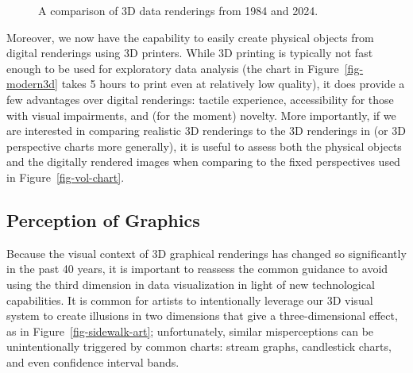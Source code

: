 \documentclass[runningheads
]{llncs}
\begin{document}
\begin{figure}
\begin{minipage}[t]{0.48\linewidth}
{{}

}

\end{minipage}%

\caption{\label{fig-graphical-advances}A comparison of 3D data
renderings from 1984 and 2024.}

\end{figure}

Moreover, we now have the capability to easily create physical objects
from digital renderings using 3D printers. While 3D printing is
typically not fast enough to be used for exploratory data analysis (the
chart in Figure~\ref{fig-modern3d} takes 5 hours to print even at
relatively low quality), it does provide a few advantages over digital
renderings: tactile experience, accessibility for those with visual
impairments, and (for the moment) novelty. More importantly, if we are
interested in comparing realistic 3D renderings to the 3D renderings in
\textcite{clevelandGraphicalPerceptionTheory1984} (or 3D perspective
charts more generally), it is useful to assess both the physical objects
and the digitally rendered images when comparing to the fixed
perspectives used in Figure~\ref{fig-vol-chart}.

\hypertarget{perception-of-graphics}{%
\subsection{Perception of Graphics}\label{perception-of-graphics}}

Because the visual context of 3D graphical renderings has changed so
significantly in the past 40 years, it is important to reassess the
common guidance to avoid using the third dimension in data visualization
in light of new technological capabilities. It is common for artists to
intentionally leverage our 3D visual system to create illusions in two
dimensions that give a three-dimensional effect, as in
Figure~\ref{fig-sidewalk-art}; unfortunately, similar misperceptions can
be unintentionally triggered by common charts: stream graphs,
candlestick charts, and even confidence interval bands.
\end{document}
